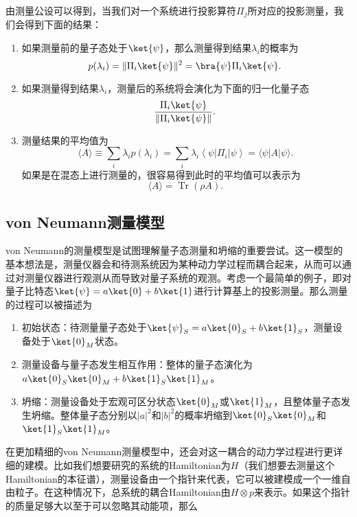由测量公设可以得到，当我们对一个系统进行投影算符$\Pi_j$所对应的投影测量，我们会得到下面的结果：
\begin{enumerate}
\item 如果测量前的量子态处于$\ket{\psi}$，那么测量得到结果$\lambda_i$的概率为\begin{equation}
p(\lambda_i)=\Vert \Pi_i\ket{\psi}\Vert^2=\bra{\psi}\Pi_i\ket{\psi}.~
\end{equation}
\item 如果测量得到结果$\lambda_i$，测量后的系统将会演化为下面的归一化量子态
\begin{equation}
\frac{\Pi_i\ket{\psi}}{\Vert\Pi_i\ket{\psi}\Vert}.~
\end{equation}
\item 测量结果的平均值为\begin{equation}
\langle A\rangle \equiv \sum_i \lambda_i p\left(\lambda_i\right)=\sum_i \lambda_i\left\langle\psi\left|\Pi_i\right| \psi\right\rangle=\langle\psi|A| \psi\rangle.~
\end{equation}
如果是在混态上进行测量的，很容易得到此时的平均值可以表示为
\begin{equation}
\langle A\rangle=\operatorname{Tr}(\rho A).~
\end{equation}

\end{enumerate}

\subsection{von Neumann测量模型}

von Neumann的测量模型是试图理解量子态测量和坍缩的重要尝试。这一模型的基本想法是，测量仪器会和待测系统因为某种动力学过程而耦合起来，从而可以通过对测量仪器进行观测从而导致对量子系统的观测。考虑一个最简单的例子，即对量子比特态$\ket{\psi}=a\ket{0}+b\ket{1}$进行计算基上的投影测量。那么测量的过程可以被描述为
\begin{enumerate}
\item 初始状态：待测量量子态处于$\ket{\psi}_S=a\ket{0}_S+b\ket{1}_S$，测量设备处于$\ket{0}_M$状态。
\item 测量设备与量子态发生相互作用：整体的量子态演化为$a\ket{0}_S\ket{0}_M+b\ket{1}_S\ket{1}_M$。
\item 坍缩：测量设备处于宏观可区分状态$\ket{0}_M$或$\ket{1}_M$，且整体量子态发生坍缩。整体量子态分别以$|a|^2$和$|b|^2$的概率坍缩到$\ket{0}_S\ket{0}_M$和$\ket{1}_S\ket{1}_M$。
\end{enumerate}

在更加精细的von Neumann测量模型中，还会对这一耦合的动力学过程进行更详细的建模。比如我们想要研究的系统的Hamiltonian为$H$（我们想要去测量这个Hamiltonian的本征谱），测量设备由一个指针来代表，它可以被建模成一个一维自由粒子。在这种情况下，总系统的耦合Hamiltonian由$H\otimes p$来表示。如果这个指针的质量足够大以至于可以忽略其动能项，那么